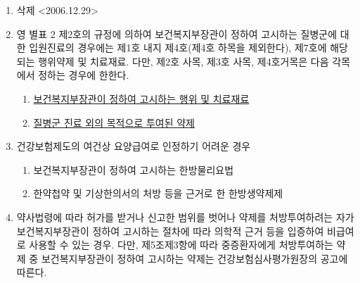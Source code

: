 \begin{enumerate}[1.]
\begin{enumerate}[가.]
	\item 「장기등 이식에 관한 법률」에 따른 장기이식을 위하여 다른 의료기관에서 채취한 골수 등 장기의 운반에 소요되는 비용
	\item 「마약류 관리에 관한 법률」 제40조에 따른 마약류중독자의 치료보호에 소요되는 비용
	\item 이 규칙 제11조제1항 또는 제13조제1항의 규정에 의하여 \uline{요양급여대상 또는 비급여대상으로 결정\cntrdot{}고시되기 전까지의 신의료기술} 등. 다만, 제11조제4항 또는 제13조제1항 후단의 규정에 의하여 소급하여 요양급여대상으로 적용되는 신의료기술 등을 제외한다. 
	\item 그 밖에 요양급여를 함에 있어서 비용효과성 등 \uline{진료상의 경제성이 불분명하여 보건복지부장관이 정하여 고시하는 검사\cntrdot{}처치\cntrdot{}수술 기타의 치료 또는 치료재료}
	\end{enumerate}
\item 삭제 <2006.12.29>
\item 영 별표 2 제2호의 규정에 의하여 보건복지부장관이 정하여 고시하는 질병군에 대한 입원진료의 경우에는 제1호 내지 제4호(제4호 하목을 제외한다), 제7호에 해당되는 행위\cntrdot{}약제 및 치료재료. 다만, 제2호 사목, 제3호 사목, 제4호거목은 다음 각목에서 정하는 경우에 한한다.
	\begin{enumerate}[가.]\tightlist
	\item \uline{보건복지부장관이 정하여 고시하는 행위 및 치료재료}
  	\item \uline{질병군 진료 외의 목적으로 투여된 약제}
	\end{enumerate}
\item 건강보험제도의 여건상 요양급여로 인정하기 어려운 경우
	\begin{enumerate}[가.]\tightlist
	\item 보건복지부장관이 정하여 고시하는 한방물리요법
  	\item 한약첩약 및 기상한의서의 처방 등을 근거로 한 한방생약제제
	\end{enumerate}
\item 약사법령에 따라 허가를 받거나 신고한 범위를 벗어나 약제를 처방\cntrdot{}투여하려는 자가 보건복지부장관이 정하여 고시하는 절차에 따라 의학적 근거 등을 입증하여 비급여로 사용할 수 있는 경우. 다만, 제5조제3항에 따라 중증환자에게 처방\cntrdot{}투여하는 약제 중 보건복지부장관이 정하여 고시하는 약제는 건강보험심사평가원장의 공고에 따른다.
\end{enumerate}
